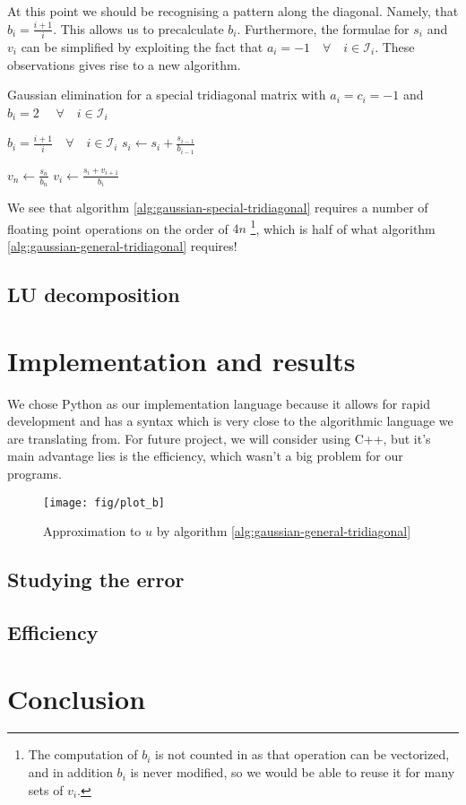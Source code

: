 \documentclass[a4paper]{article}
\begin{document}
At this point we should be recognising a pattern along the diagonal. Namely, that $b_i = \frac{i+1}{i}$. This allows us to precalculate $b_i$. Furthermore, the formulae for $s_i$ and $v_i$ can be simplified by exploiting the fact that $a_i = -1 \quad \forall \quad i \in \mathcal{I}_i$.
These observations gives rise to a new algorithm.

\begin{algorithm}
\caption{Gaussian elimination for a special tridiagonal matrix with $a_i = c_i = -1$ and $b_i = 2$ $\quad \forall \quad i \in \mathcal{I}_i$} \label{alg:gaussian-special-tridiagonal}
\begin{algorithmic}[1]
  \Require $b_i = \frac{i+1}{i} \quad \forall \quad i \in \mathcal{I}_i$
   
    \State $s_i \gets s_i + \frac{s_{i-1}}{b_{i-1}}$ 
  \EndFor

  \Statex {}
  \State $v_n \gets \frac{s_n}{b_n}$
    \State $v_i \gets \frac{s_i + v_{i+1}}{b_i}$
  \EndFor
\end{algorithmic}
\end{algorithm}

We see that algorithm \ref{alg:gaussian-special-tridiagonal} requires a number of floating point operations on the order of $4n$ \footnote{The computation of $b_i$ is not counted in as that operation can be vectorized, and in addition $b_i$ is never modified, so we would be able to reuse it for many sets of $v_i$.}, which is half of what algorithm \ref{alg:gaussian-general-tridiagonal} requires! 

\subsection{LU decomposition}


\section{Implementation and results}\label{sec:implementation_and_results}
We chose Python as our implementation language because it allows for rapid development and has a syntax which is very close to the algorithmic language we are translating from. For future project, we will consider using C++, but it's main advantage lies is the efficiency, which wasn't a big problem for our programs.

\begin{figure}[ht]
\texttt{[image: fig/plot\_b]}
\caption{Approximation to $u$ by algorithm \ref{alg:gaussian-general-tridiagonal}}
\end{figure}

\subsection{Studying the error}

\subsection{Efficiency}


\section{Conclusion}\label{sec:conclusion}

%
%

{}
\end{document}
